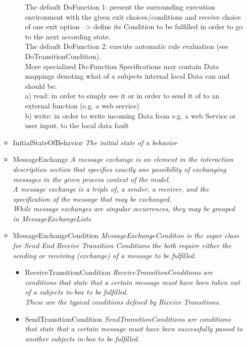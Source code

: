 \begin{itemize}
\begin{itemize}
\begin{itemize}
{			The default DoFunction 1: present the surrounding execution environment with the given exit choices/conditions and receive choice of one exit option --> define its Condition to be fulfilled in order to go to the next according state.\\
			The default DoFunction 2: execute automatic rule evaluation (see DoTransitionCondition).\\
			More specialized Do-Function Specifications may contain Data mappings denoting what of a subjects internal local Data can and should be:\\
			a) read: in order to simply see it or in order to send it of to an external function (e.g. a web service)\\
			b) write: in order to write incoming Data from e.g. a web Service or user input, to the local data fault}
	\end{itemize}
	\item InitialStateOfBehavior \linebreak \textit{The initial state of a behavior}
	\item MessageExchange \linebreak \textit{A message exchange is an element in the interaction description section that specifies exactly one possibility of exchanging messages in the given process context of the model.\\
	A message exchange is a triple of, a sender, a receiver, and the specification of the message that may be exchanged.\\
	While message exchanges are singular occurrences, they may be grouped in MessageExchangeLists}
	\item MessageExchangeCondition \linebreak \textit{MessageExchangeConditon is the super class for Send End Receive Transition Conditions the both require either the sending or receiving (exchange) of a message to be fulfilled.}
	\begin{itemize}
		\item ReceiveTransitionCondition \linebreak \textit{ReceiveTransitionConditions are conditions that state that a certain message must have been taken out of a subjects in-box to be fulfilled.\\
		These are the typical conditions defined by Receive Transitions.}
		\item SendTransitionCondition \linebreak \textit{SendTransitionConditions are conditions that state that a certain message must have been successfully passed to another subjects in-box to be fulfilled.\\
}
\end{itemize}
\end{itemize}
\end{itemize}
